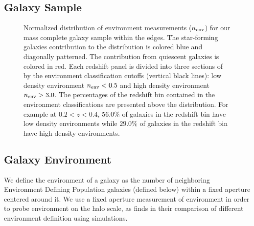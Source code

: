 \documentclass{emulateapj}
\begin{document}
\subsection{Galaxy Sample} \label{sec:target} 
\begin{figure*}
  \begin{center}
    \leavevmode
     \caption{Normalized distribution of environment measurements ($n_{\rm{env}}$) for our mass complete galaxy sample within the edges. The star-forming galaxies contribution to the distribution is colored blue and diagonally patterned. The contribution from quiescent galaxies is colored in red. Each redshift panel is divided into three sections of by the environment classification cutoffs (vertical black lines): low density environment $n_{\rm{env}} < 0.5$ and high density environment $n_{\rm{env}} > 3.0$. The percentages of the redshift bin contained in the environment classifications are presented above the distribution. For example at $0.2 < z < 0.4$, $56.0 \%$ of galaxies in the redshift bin have low density environments while $29.0\%$ of galaxies in the redshift bin have high density environments. }      \label{fig:envcount}
    \end{center}
\end{figure*}

\subsection{Galaxy Environment} \label{sec:environment}
We define the environment of a galaxy as the number of neighboring Environment Defining Population galaxies (defined below) within a fixed aperture centered around it. We use a fixed aperture measurement of environment in order to probe environment on the halo scale, as \cite{Muldrew:2012aa} finds in their comparison of different environment definition using simulations. 
\end{document}
